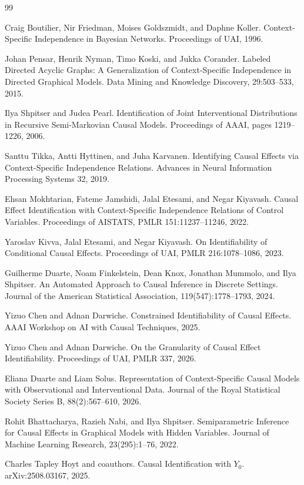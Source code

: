 \documentclass{article}
\begin{document}
\begin{thebibliography}{99}

   Craig Boutilier, Nir Friedman, Moises Goldszmidt, and Daphne Koller. Context-Specific Independence in Bayesian Networks. Proceedings of UAI, 1996.

   Johan Pensar, Henrik Nyman, Timo Koski, and Jukka Corander. Labeled Directed Acyclic Graphs: A Generalization of Context-Specific Independence in Directed Graphical Models. Data Mining and Knowledge Discovery, 29:503--533, 2015.

   Ilya Shpitser and Judea Pearl. Identification of Joint Interventional Distributions in Recursive Semi-Markovian Causal Models. Proceedings of AAAI, pages 1219--1226, 2006.

   Santtu Tikka, Antti Hyttinen, and Juha Karvanen. Identifying Causal Effects via Context-Specific Independence Relations. Advances in Neural Information Processing Systems 32, 2019.

   Ehsan Mokhtarian, Fateme Jamshidi, Jalal Etesami, and Negar Kiyavash. Causal Effect Identification with Context-Specific Independence Relations of Control Variables. Proceedings of AISTATS, PMLR 151:11237--11246, 2022.

   Yaroslav Kivva, Jalal Etesami, and Negar Kiyavash. On Identifiability of Conditional Causal Effects. Proceedings of UAI, PMLR 216:1078--1086, 2023.

   Guilherme Duarte, Noam Finkelstein, Dean Knox, Jonathan Mummolo, and Ilya Shpitser. An Automated Approach to Causal Inference in Discrete Settings. Journal of the American Statistical Association, 119(547):1778--1793, 2024.

   Yizuo Chen and Adnan Darwiche. Constrained Identifiability of Causal Effects. AAAI Workshop on AI with Causal Techniques, 2025.

   Yizuo Chen and Adnan Darwiche. On the Granularity of Causal Effect Identifiability. Proceedings of UAI, PMLR 337, 2026.

   Eliana Duarte and Liam Solus. Representation of Context-Specific Causal Models with Observational and Interventional Data. Journal of the Royal Statistical Society Series B, 88(2):567--610, 2026.

   Rohit Bhattacharya, Razieh Nabi, and Ilya Shpitser. Semiparametric Inference for Causal Effects in Graphical Models with Hidden Variables. Journal of Machine Learning Research, 23(295):1--76, 2022.

   Charles Tapley Hoyt and coauthors. Causal Identification with \(Y_0\). arXiv:2508.03167, 2025.

\end{thebibliography}
\end{document}
